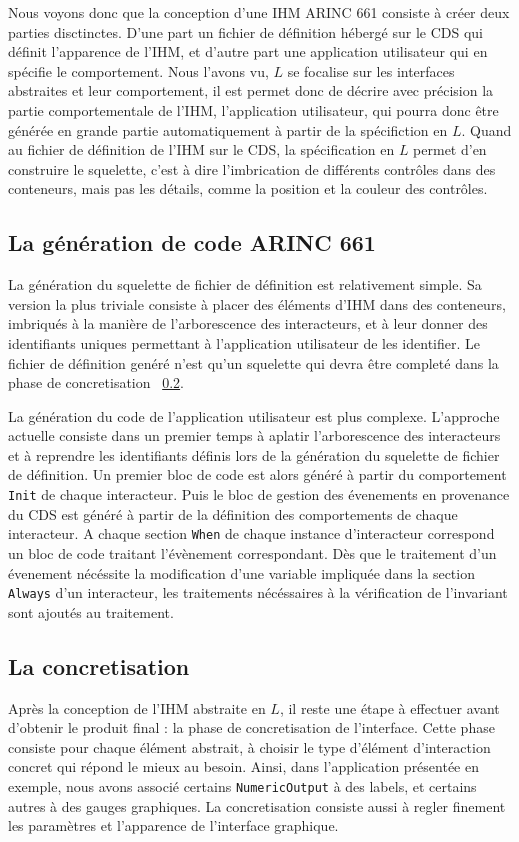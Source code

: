 \documentclass{ihm}
\begin{document}
Nous voyons donc que la conception d'une IHM ARINC 661 consiste
à créer deux parties disctinctes. D'une part un fichier de
définition hébergé sur le CDS qui définit l'apparence de l'IHM,
et d'autre part une application utilisateur qui en spécifie le
comportement. Nous l'avons vu, $L$ se focalise sur les
interfaces abstraites et leur comportement, il est permet donc
de décrire avec précision la partie comportementale de l'IHM,
l'application utilisateur, qui pourra donc être générée en
grande partie automatiquement à partir de la spécifiction en
$L$. Quand au fichier de définition de l'IHM sur le CDS, la
spécification en $L$ permet d'en construire le squelette, c'est
à dire l'imbrication de différents contrôles dans des
conteneurs, mais pas les détails, comme la position et la
couleur des contrôles.

\subsection{La génération de code ARINC 661}

La génération du squelette de fichier de définition est
relativement simple. Sa version la plus triviale consiste à
placer des éléments d'IHM dans des conteneurs, imbriqués à la
manière de l'arborescence des interacteurs, et à leur donner des
identifiants uniques permettant à l'application utilisateur de
les identifier. Le fichier de définition genéré n'est qu'un
squelette qui devra être completé dans la phase de
concretisation ~\ref{sec:concretisation}.

La génération du code de l'application utilisateur est plus
complexe. L'approche actuelle consiste dans un premier temps à
aplatir l'arborescence des interacteurs et à reprendre les
identifiants définis lors de la génération du squelette de
fichier de définition. Un premier bloc de code est alors généré
à partir du comportement \lstinline$Init$ de chaque interacteur.
Puis le bloc de gestion des évenements en provenance du CDS est
généré à partir de la définition des comportements de chaque
interacteur. A chaque section \lstinline$When$ de chaque
instance d'interacteur correspond un bloc de code traitant
l'évènement correspondant. Dès que le traitement d'un évenement
nécéssite la modification d'une variable impliquée dans la
section \lstinline$Always$ d'un interacteur, les traitements
nécéssaires à la vérification de l'invariant sont ajoutés au
traitement.

\subsection{La concretisation} \label{sec:concretisation}
Après la conception de l'IHM abstraite en $L$, il reste une
étape à effectuer avant d'obtenir le produit final : la phase de
concretisation de l'interface. Cette phase consiste pour chaque
élément abstrait, à choisir le type d'élément d'interaction
concret qui répond le mieux au besoin. Ainsi, dans l'application
présentée en exemple, nous avons associé certains
\lstinline$NumericOutput$ à des labels, et certains autres à des
gauges graphiques. La concretisation consiste aussi à regler
finement les paramètres et l'apparence de l'interface graphique.
\end{document}
